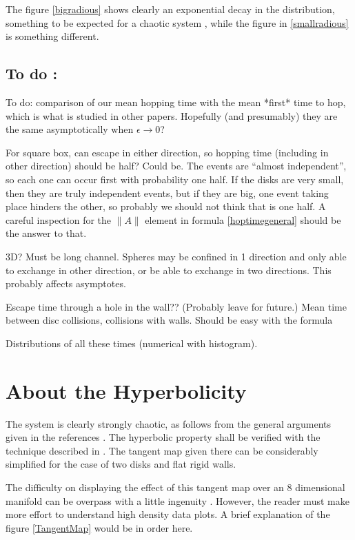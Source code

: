 \documentclass[a4paper,10pt]{article}
\begin{document}
The figure \ref{bigradious} shows clearly an exponential decay in the
distribution, something to be expected for a chaotic system \cite{OttLibro} , while the
figure in \ref{smallradious} is something different. 


\subsection{ To do : }
To do: comparison of our mean hopping time with the mean *first* time to hop, which is what is studied in other papers.
Hopefully (and presumably) they are the same asymptotically when $\epsilon \to 0$? 

For square box, can escape in either direction, so hopping time (including in other direction) should be half? Could be. The events are ``almost independent'', so each one
can occur first with probability one half. If the disks are very small, then
they are truly independent events, but if they are big, one event taking
place hinders the other, so probably we should not think that is 
one half. A careful inspection for the $\|A\|$ element in formula \ref{hoptimegeneral}
should be the answer to that.


 3D?  Must be long channel. Spheres may be confined in 1 direction  
and only able to exchange in other direction, or be able to exchange in two directions.
This probably affects asymptotes.

Escape time through a hole in the wall?? (Probably leave for future.)
Mean time between disc collisions, collisions with walls. Should be easy with the formula

Distributions of all these times (numerical with histogram).



\section{About the Hyperbolicity}

The system is clearly strongly chaotic, as follows from
the general arguments given in the references \cite{Sim99, MarkChern}.
The hyperbolic property shall be verified with the technique described
in \cite{Dellago96}. The tangent map given there can be considerably
simplified for the case of two disks and flat rigid walls.

The difficulty on displaying the effect of this tangent map over
an 8 dimensional manifold
can be overpass with a little ingenuity \cite{Tufte}. However,
the reader must make more effort to understand high density data
plots. A brief explanation of the figure \ref{TangentMap} would
be in order here. 
\end{document}
